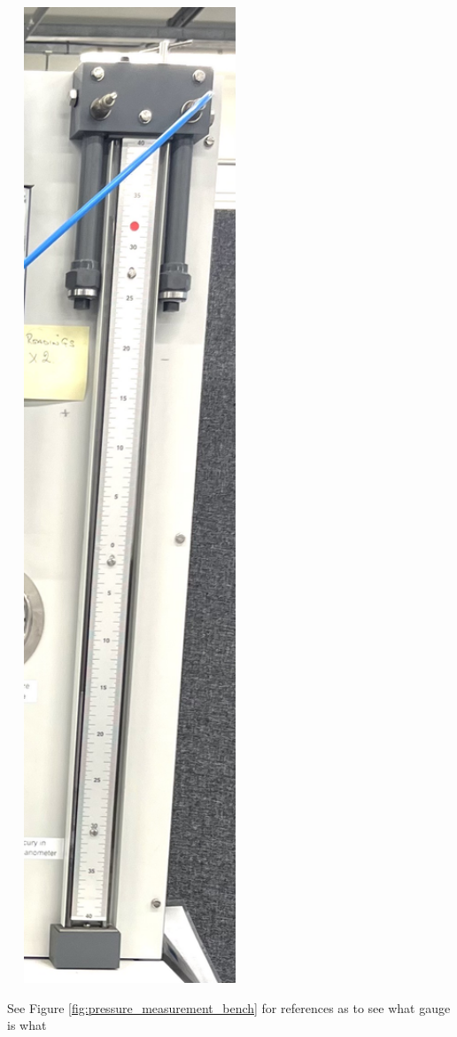 \documentclass{article}
\begin{document}
\begin{minipage}{0.45\textwidth}
\begin{center}
\begin{minipage}{0.45\textwidth}
			\end{minipage}\hspace{0.5em}
			\begin{minipage}{0.4\textwidth}\centering
				\includegraphics[width=0.55\textwidth]{images/Image(2).jpg}
			\end{minipage}
			\small See Figure \ref{fig:pressure_measurement_bench} for references as to see what gauge is what
		\end{center}
	\end{minipage}
\end{document}
